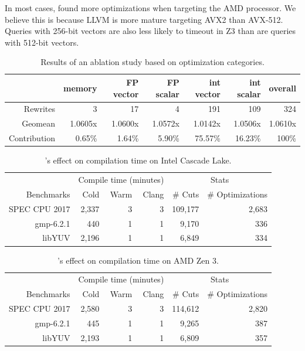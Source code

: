 In most cases, \minotaur{} found more optimizations when targeting the AMD
processor.
%
We believe this is because LLVM is more mature targeting
AVX2 than AVX-512.
%
Queries with 256-bit vectors are also less likely to timeout in Z3 than
are queries with 512-bit vectors.

\begin{table}[t]
  \centering
  \caption{Results of an ablation study based on optimization categories.}
  \begin{tabular}{ r | r r r r r r}
    & memory & FP vector & FP scalar& int vector & int scalar & overall \\
    \hline
    Rewrites & 3 & 17 & 4 & 191 & 109 & 324 \\
    Geomean & 1.0605x & 1.0600x & 1.0572x & 1.0142x & 1.0506x & 1.0610x \\
    Contribution & 0.65\% & 1.64\% & 5.90\% & 75.57\% & 16.23\% & 100\% \\
  \end{tabular}
  \label{tab:ablation}
\end{table}


\begin{table}[t]
  \centering
  \caption{\minotaur's effect on compilation time on Intel Cascade Lake.}
  \begin{tabular}{r | r r r | r r }
    & \multicolumn{3}{c|}{Compile time (minutes)} & \multicolumn{2}{c}{Stats} \\
    Benchmarks & Cold & Warm & Clang & \# Cuts & \# Optimizations \\
    \hline
    SPEC CPU 2017 & 2,337 & 3 & 3 & 109,177 & 2,683  \\
    gmp-6.2.1 & 440 &  1 &  1 & 9,170 & 336 \\
    libYUV & 2,196 &  1 &  1 & 6,849 & 334  \\
  \end{tabular}
  \label{tab:compiletimeintel}
\end{table}

\begin{table}[t]
  \centering
  \caption{\minotaur's effect on compilation time on AMD Zen 3.}
  \begin{tabular}{r | r r r | r r}

    & \multicolumn{3}{c|}{Compile time (minutes)} & \multicolumn{2}{c}{Stats} \\
    Benchmarks & Cold & Warm & Clang & \# Cuts & \# Optimizations \\
    \hline
    SPEC CPU 2017 & 2,580 & 3 & 3 & 114,612 & 2,820 \\
    gmp-6.2.1 &  445 & 1 & 1 & 9,265 & 387\\
    libYUV  & 2,193 & 1 & 1 & 6,809 & 357 \\

  \end{tabular}
  \label{tab:compiletimeamd}
\end{table}


